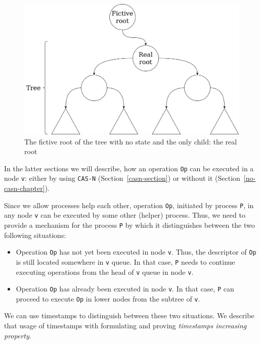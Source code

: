 \documentclass[times, dvipsnames,%
               languages={russian,english} %
              ]{itmo-student-thesis}
\begin{document}
\begin{figure}[H]
  \centering
  \caption{The fictive root of the tree with no state and the only child: the real root}
  \label{fictive-root-pic}
  \includegraphics[width=\linewidth]{pics/fictive-root.png}
\end{figure}


In the latter sections we will describe, how an operation \texttt{Op} can be executed in a node \texttt{v}: either by using \texttt{CAS-N} (Section~\ref{casn-section})  or without it (Section~\ref{no-casn-chapter}).

Since we allow processes help each other, operation \texttt{Op}, initiated by process \texttt{P}, in any node \texttt{v} can be executed by some other (helper) process. Thus, we need to provide a mechanism for the process \texttt{P} by which it distinguishes between the two following situations:

\begin{itemize}
    \item Operation \texttt{Op} has not yet been executed in node \texttt{v}. Thus, the descriptor of \texttt{Op} is still located somewhere in \texttt{v} queue. In that case, \texttt{P} needs to continue executing operations from the head of \texttt{v} queue in node \texttt{v}.
    
    \item Operation \texttt{Op} has already been executed in node \texttt{v}. In that case, \texttt{P} can proceed to execute \texttt{Op} in lower nodes from the subtree of \texttt{v}.
\end{itemize}

\bigbreak

We can use timestamps to distinguish between these two situations. We describe that usage of timestamps with formulating and proving \emph{timestamps increasing property}. 
\end{document}
